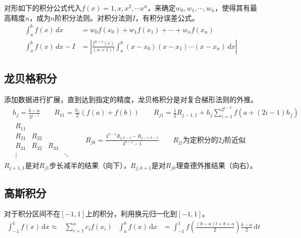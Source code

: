 \documentclass[twocolumn]{article}
\begin{document}
对形如下的积分公式代入$f(x)=1,x,x^2,\cdots x^n$，来确定$w_0,w_1,\cdots,w_n$，使得其有最高精度$n$，成为$n$阶积分法则。对积分法则$I$，有积分误差公式。
\begin{align*}
    \int_{a}^{b} f(x) \,dx &= w_0f(x_0)+w_1f(x_1)+\cdots+w_nf(x_n)\\
    \int_{a}^{b} f(x) \,dx - I &= \left| \frac{f^{n+1}(c)}{(n+1)!}\int_{a}^{b} (x-x_0)(x-x_1)\cdots(x-x_n) \,dx  \right|
\end{align*}

\subsection{龙贝格积分}
添加数据进行扩展，直到达到指定的精度，龙贝格积分是对复合梯形法则的外推。
\begin{align*}
    &h_j=\frac{b-a}{2^{j-1}} \qquad R_{11}=\frac{h_1}{2}(f(a)+f(b)) \qquad R_{j1}=\frac{1}{2}R_{j-1,1}+h_j\sum_{i=1}^{2^{j-2}}f(a+(2i-1)h_j)\\
     & \begin{matrix}
        R_{11} &        &        &\\
        R_{21} & R_{22} &        &\\
        R_{31} & R_{32} & R_{33}&\\
        \vdots&&&\ddots
    \end{matrix}
    \qquad R_{jk}=\frac{4^{k-1}R_{j,k-1}-R_{j-1,k-1}}{4^{k-1}-1} \qquad R_{jj}\text{为定积分的}2j\text{阶近似}
\end{align*}
$R_{j+1,1}$是对$R_{j1}$步长减半的结果（向下），$R_{j,k+1}$是对$R_{jk}$理查德外推结果（向右）。

\subsection{高斯积分}
对于积分区间不在$[-1,1]$上的积分，利用换元归一化到$[-1,1]$。
\begin{align*}
    \int_{-1}^{1} f(x) \,\mathrm{d}x \approx & \sum_{i=1}^{n}c_if(x_i) & \int_{a}^{b} f(x) \,\mathrm{d}x & = \int_{-1}^{1} f\left( \frac{(b-a)t+b+a}{2} \right)\frac{b-a}{2} \,\mathrm{d}t
\end{align*}
\end{document}
